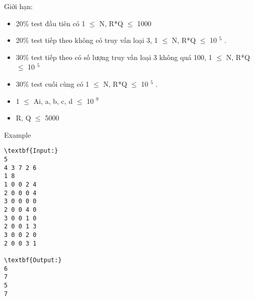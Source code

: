 Giới hạn:
\begin{itemize}
	\item 20\% test đầu tiên có 1  $\le$  N, R*Q  $\le$  1000
	\item 20\% test tiếp theo không có truy vấn loại 3, 1  $\le$  N, R*Q  $\le$  10 $^ 5 $ .
	\item 30\% test tiếp theo có số lượng truy vấn loại 3 không quá 100, 1  $\le$  N, R*Q  $\le$  10 $^ 5 $
	\item 30\% test cuối cùng có 1  $\le$  N, R*Q  $\le$  10 $^ 5 $ .
	\item 1  $\le$  Ai, a, b, c, d  $\le$  10 $^ 9 $
	\item R, Q  $\le$  5000
\end{itemize}
Example
\begin{verbatim}
\textbf{Input:}
5
4 3 7 2 6
1 8
1 0 0 2 4
2 0 0 0 4
3 0 0 0 0
2 0 0 4 0
3 0 0 1 0
2 0 0 1 3
3 0 0 2 0
2 0 0 3 1

\textbf{Output:}
6
7
5
7
\end{verbatim}